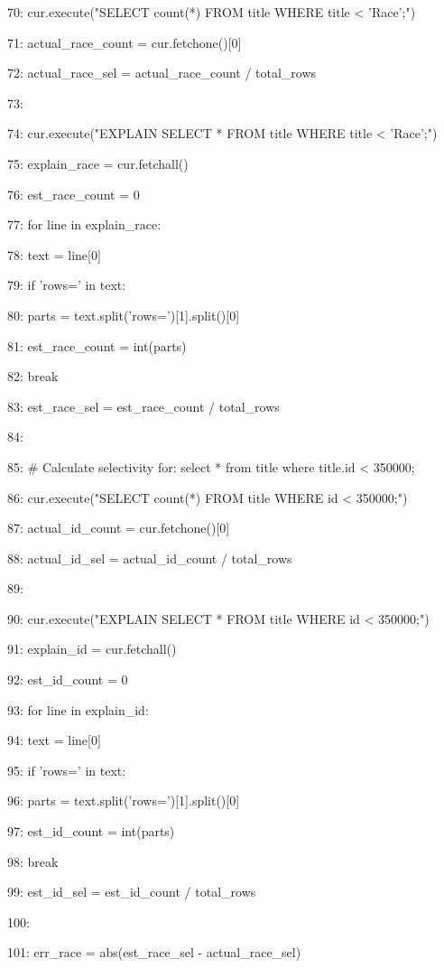 \documentclass[11pt,a4paper]{article}
\begin{document}
{70:     cur.execute("SELECT count(*) FROM title WHERE title < 'Race';")

71:     actual\_race\_count = cur.fetchone()[0]

72:     actual\_race\_sel = actual\_race\_count / total\_rows

73:

74:     cur.execute("EXPLAIN SELECT * FROM title WHERE title < 'Race';")

75:     explain\_race = cur.fetchall()

76:     est\_race\_count = 0

77:     for line in explain\_race:

78:         text = line[0]

79:         if 'rows=' in text:

80:             parts = text.split('rows=')[1].split()[0]

81:             est\_race\_count = int(parts)

82:             break

83:     est\_race\_sel = est\_race\_count / total\_rows

84:

85:     \# Calculate selectivity for: select * from title where title.id < 350000;

86:     cur.execute("SELECT count(*) FROM title WHERE id < 350000;")

87:     actual\_id\_count = cur.fetchone()[0]

88:     actual\_id\_sel = actual\_id\_count / total\_rows

89:

90:     cur.execute("EXPLAIN SELECT * FROM title WHERE id < 350000;")

91:     explain\_id = cur.fetchall()

92:     est\_id\_count = 0

93:     for line in explain\_id:

94:         text = line[0]

95:         if 'rows=' in text:

96:             parts = text.split('rows=')[1].split()[0]

97:             est\_id\_count = int(parts)

98:             break

99:     est\_id\_sel = est\_id\_count / total\_rows

100:

101:     err\_race = abs(est\_race\_sel - actual\_race\_sel)

}
\end{document}
